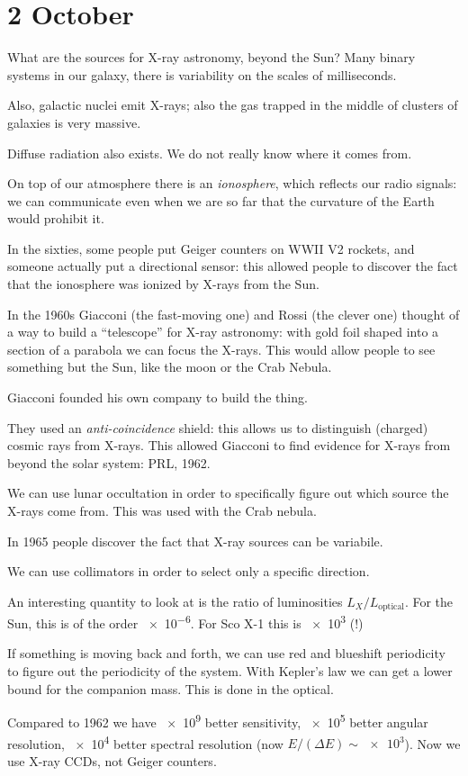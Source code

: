 \documentclass[main.tex]{subfiles}
\begin{document}
\section*{2 October}

What are the sources for X-ray astronomy, beyond the Sun? Many binary systems in our galaxy, there is variability on the scales of milliseconds.

Also, galactic nuclei emit X-rays; also the gas trapped in the middle of clusters of galaxies is very massive.

Diffuse radiation also exists. We do not really know where it comes from.

On top of our atmosphere there is an \emph{ionosphere}, which reflects our radio signals: we can communicate even when we are so far that the curvature of the Earth would prohibit it.

In the sixties, some people put Geiger counters on WWII V2 rockets, and someone actually put a directional sensor: this allowed people to discover the fact that the ionosphere was ionized by X-rays from the Sun.

In the 1960s Giacconi (the fast-moving one) and Rossi (the clever one) thought of a way to build a ``telescope'' for X-ray astronomy: with gold foil shaped into a section of a parabola we can focus the X-rays.
This would allow people to see something but the Sun, like the moon or the Crab Nebula.

Giacconi founded his own company to build the thing.

They used an \emph{anti-coincidence} shield: this allows us to distinguish (charged) cosmic rays from X-rays.
This allowed Giacconi to find evidence for X-rays from beyond the solar system: PRL, 1962.

We can use lunar occultation in order to specifically figure out which source the X-rays come from. This was used with the Crab nebula.

In 1965 people discover the fact that X-ray sources can  be variabile.

We can use collimators in order to select only a specific direction.

An interesting quantity to look at is the ratio of luminosities \(L_X / L_{\text{optical}}\). For the Sun, this is of the order \num{e-6}. For Sco X-1 this is \num{e3} (!)

If something is moving back and forth, we can use red and blueshift periodicity to figure out the periodicity of the system.
With Kepler's law we can get a lower bound for the companion mass.
This is done in the optical.

Compared to 1962 we have \num{e9} better sensitivity, \num{e5} better angular resolution, \num{e4} better spectral resolution (now \(E / (\Delta E ) \sim \num{e3} \)). Now we use X-ray CCDs, not Geiger counters.
\end{document}
